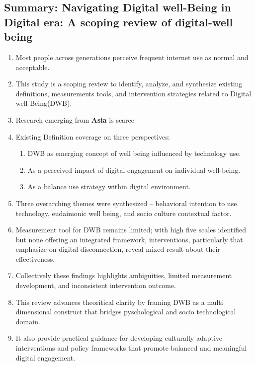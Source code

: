 \documentclass[12pt]{article}
\begin{document}
\subsection{Summary: Navigating Digital well-Being in Digital era: A scoping review of digital-well being } \cite{Zhao2024DigitalWellbeing}
\begin{enumerate}
    \item Most people across generations perceive frequent internet use as normal and acceptable.
    \item This study is a scoping review to identify, analyze, and synthesize existing definitions, measurements tools, and intervention strategies related to Digital well-Being(DWB).
    \item  Research emerging from \textbf{Asia} is scarce
        \item Existing Definition coverage on three perspectives:
        \begin{enumerate}
            \item DWB as emerging concept of well being influenced by technology use.
            \item As a perceived impact of digital engagement on individual well-being.
            \item As a balance use strategy within digital environment.
        \end{enumerate}
        \item Three overarching themes were synthesized -- behavioral intention to use technology, eudaimonic well being, and socio culture contextual factor.
        \item Measurement tool for DWB remains limited; with high five scales identified but none offering an integrated framework, interventions, particularly that emphasize on digital disconnection, reveal mixed result about their effectiveness.
        \item Collectively these findings highlights ambiguities, limited measurement development, and inconsistent intervention outcome.
        \item This review advances theoritical clarity by framing DWB as a multi dimensional construct that bridges pyschological and socio technological domain.
        \item It also provide practical guidance for developing culturally adaptive interventions and policy frameworks that promote balanced and meaningful digital engagement.
    \end{enumerate}
\end{document}
